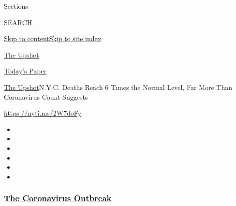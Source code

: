 Sections

SEARCH

\protect\hyperlink{site-content}{Skip to
content}\protect\hyperlink{site-index}{Skip to site index}

\href{https://www.nytimes3xbfgragh.onion/section/upshot}{The Upshot}

\href{https://myaccount.nytimes3xbfgragh.onion/auth/login?response_type=cookie\&client_id=vi}{}

\href{https://www.nytimes3xbfgragh.onion/section/todayspaper}{Today's
Paper}

\href{/section/upshot}{The Upshot}\textbar{}N.Y.C. Deaths Reach 6 Times
the Normal Level, Far More Than Coronavirus Count Suggests

\url{https://nyti.ms/2W7doFy}

\begin{itemize}
\item
\item
\item
\item
\item
\item
\end{itemize}

\hypertarget{the-coronavirus-outbreak}{%
\subsubsection{\texorpdfstring{\href{https://www.nytimes3xbfgragh.onion/news-event/coronavirus?name=styln-coronavirus-national\&region=TOP_BANNER\&block=storyline_menu_recirc\&action=click\&pgtype=Interactive\&impression_id=c5d19cf0-f4b8-11ea-b7e2-937559d5cb01\&variant=undefined}{The
Coronavirus
Outbreak}}{The Coronavirus Outbreak}}\label{the-coronavirus-outbreak}}

